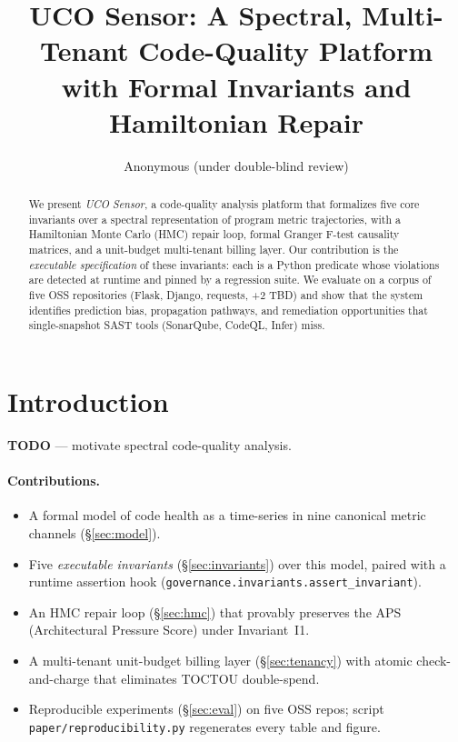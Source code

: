 \documentclass[acmsmall, screen]{acmart}
\title{UCO Sensor: A Spectral, Multi-Tenant Code-Quality Platform with Formal Invariants and Hamiltonian Repair}
\author{Anonymous (under double-blind review)}
\begin{document}
\maketitle

\begin{abstract}
We present \emph{UCO Sensor}, a code-quality analysis platform that
formalizes five core invariants over a spectral representation of
program metric trajectories, with a Hamiltonian Monte Carlo (HMC) repair
loop, formal Granger F-test causality matrices, and a unit-budget
multi-tenant billing layer.  Our contribution is the \emph{executable
specification} of these invariants: each is a Python predicate whose
violations are detected at runtime and pinned by a regression suite.
We evaluate on a corpus of five OSS repositories
(Flask, Django, requests, +2 TBD) and show that the system identifies
prediction bias, propagation pathways, and remediation opportunities
that single-snapshot SAST tools (SonarQube, CodeQL, Infer) miss.
\end{abstract}

\section{Introduction}

\textbf{TODO} — motivate spectral code-quality analysis.

\paragraph{Contributions.}
\begin{itemize}
\item A formal model of code health as a time-series in nine canonical
      metric channels (\S\ref{sec:model}).
\item Five \emph{executable invariants} (\S\ref{sec:invariants}) over
      this model, paired with a runtime assertion hook
      (\texttt{governance.invariants.assert\_invariant}).
\item An HMC repair loop (\S\ref{sec:hmc}) that provably preserves the
      APS (Architectural Pressure Score) under Invariant~I1.
\item A multi-tenant unit-budget billing layer
      (\S\ref{sec:tenancy}) with atomic check-and-charge that
      eliminates TOCTOU double-spend.
\item Reproducible experiments (\S\ref{sec:eval}) on five OSS repos;
      script \texttt{paper/reproducibility.py} regenerates every
      table and figure.
\end{itemize}
\end{document}
